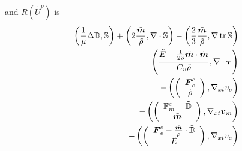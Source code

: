 \documentclass{article}
\begin{document}
and $R(\tilde U^p)$ is
\begin{align*}
	\LRp{\frac{1}{\mu}\Delta\mathbb{D},\mathbb{S}}+\LRp{2\frac{\tilde\bfm}{\tilde\rho},\Div\mathbb{S}}
	-\LRp{\frac{2}{3}\frac{\tilde\bfm}{\tilde\rho},\Grad\trace{\mathbb{S}}}\\
	-\LRp{\frac{\tilde E-\frac{1}{2\tilde\rho}\tilde\bfm\cdot\tilde\bfm}{C_v\tilde\rho},\Div\bftau}\\
	-\LRp{\vecttwo{\bfF^c_c}{\tilde\rho},\Gradxt v_c}\\
	-\LRp{\vecttwo{\mathbb{F}^c_m-\tilde{\mathbb{D}}}{\tilde\bfm},\Gradxt\bfv_m}\\
	-\LRp{\vecttwo{\bfF^c_e-\frac{\tilde\bfm}{\tilde\rho}\cdot\tilde{\mathbb{D}}}{\tilde E},\Gradxt v_e}
\end{align*}
\end{document}
